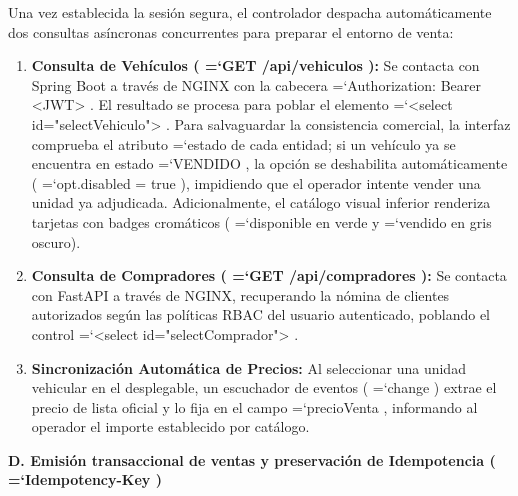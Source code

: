 \documentclass[11pt,a4paper]{article}
\renewcommand{\_}{\oldunderscore\allowbreak}
\DeclareRobustCommand{\texttt}[1]{%
  {\upshape\ttfamily\fontsize{9}{10.8}\selectfont\hyphenchar\font=`\-\relax #1}%
}
\begin{document}
\noindent Una vez establecida la sesión segura, el controlador despacha automáticamente dos consultas asíncronas concurrentes para preparar el entorno de venta:
\begin{enumerate}[leftmargin=*,itemsep=2pt,topsep=1pt]
  \item \textbf{Consulta de Vehículos (\texttt{GET /\allowbreak{}api/\allowbreak{}vehiculos}):} Se contacta con Spring Boot a través de NGINX con la cabecera \texttt{Authorization: Bearer <JWT>}. El resultado se procesa para poblar el elemento \texttt{<select id=\allowbreak{}"selectVehiculo">}. Para salvaguardar la consistencia comercial, la interfaz comprueba el atributo \texttt{estado} de cada entidad; si un vehículo ya se encuentra en estado \texttt{VENDIDO}, la opción se deshabilita automáticamente (\texttt{opt.\allowbreak{}disabled = true}), impidiendo que el operador intente vender una unidad ya adjudicada. Adicionalmente, el catálogo visual inferior renderiza tarjetas con badges cromáticos (\texttt{disponible} en verde y \texttt{vendido} en gris oscuro).
  \item \textbf{Consulta de Compradores (\texttt{GET /\allowbreak{}api/\allowbreak{}compradores}):} Se contacta con FastAPI a través de NGINX, recuperando la nómina de clientes autorizados según las políticas RBAC del usuario autenticado, poblando el control \texttt{<select id=\allowbreak{}"selectComprador">}.
  \item \textbf{Sincronización Automática de Precios:} Al seleccionar una unidad vehicular en el desplegable, un escuchador de eventos (\texttt{change}) extrae el precio de lista oficial y lo fija en el campo \texttt{precioVenta}, informando al operador el importe establecido por catálogo.
\end{enumerate}

\vspace{0.2cm}
\noindent\textbf{D. Emisión transaccional de ventas y preservación de Idempotencia (\texttt{Idempotency-Key})}
\end{document}
